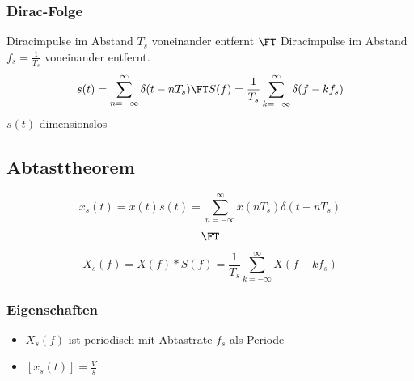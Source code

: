 \begin{sectionbox}
    \subsubsection{Dirac-Folge}
    Diracimpulse im Abstand $T_s$ voneinander entfernt $\FT$ Diracimpulse im Abstand $f_s=\frac{1}{T_s}$ voneinander entfernt.
    \begin{equation*}
        s(t) = \sum_{n=-\infty}^{\infty}\delta(t-nT_s) \FT S(f) = \frac{1}{T_s}\sum_{k=-\infty}^{\infty}\delta(f - kf_s)
    \end{equation*}
    $s(t)$ dimensionslos
\end{sectionbox}

\subsection{Abtasttheorem}
\begin{sectionbox}
    \begin{emphbox}
        \begin{equation*}
            x_s(t) = x(t)s(t)=\sum_{n=-\infty}^{\infty}x(nT_s)\delta(t - nT_s)
        \end{equation*}
        \begin{equation*}
            \FT
        \end{equation*}
        \begin{equation*}
            X_s(f) = X(f) * S(f) = \frac{1}{T_s}\sum_{k=-\infty}^{\infty}X(f-kf_s)
        \end{equation*}
    \end{emphbox}

    \subsubsection{Eigenschaften}
    \begin{itemize}
        \item $X_s(f)$ ist periodisch mit Abtastrate $f_s$ als Periode
        \item $[x_s(t)]=\frac{V}{s}$
    \end{itemize}
\end{sectionbox}

